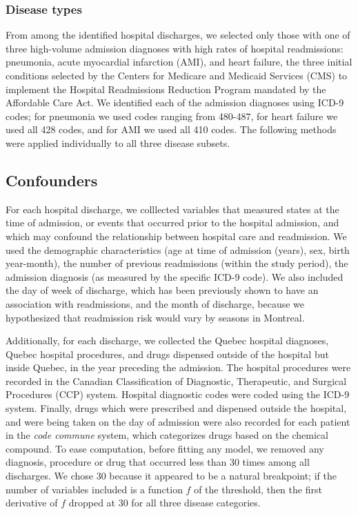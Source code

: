 \documentclass[]{article}\usepackage[]{graphicx}\usepackage[]{color}
\begin{document}
\subsubsection{Disease types}
From among the identified hospital discharges, we selected only those with one of three high-volume admission diagnoses with high rates of hospital readmissions: pneumonia, acute myocardial infarction (AMI), and heart failure, the three initial conditions selected by the Centers for Medicare and Medicaid Services (CMS) to implement the Hospital Readmissions Reduction Program mandated by the Affordable Care Act. We identified each of the admission diagnoses using ICD-9 codes; for pneumonia we used codes ranging from 480-487, for heart failure we used all 428 codes, and for AMI we used all 410 codes. The following methods were applied individually to all three disease subsets. 



\subsection{Confounders}
For each hospital discharge, we colllected variables that measured states at the time of admission, or events that occurred prior to the hospital admission, and which may confound the relationship between hospital care and readmission. We used the demographic characteristics (age at time of admission (years), sex, birth year-month), the number of previous readmissions (within the study period), the admission diagnosis (as measured by the specific ICD-9 code). We also included the day of week of discharge, which has been previously shown to have an association with readmissions, and the month of discharge, because we hypothesized that readmission risk would vary by seasons in Montreal.

Additionally, for each discharge, we collected the Quebec hospital diagnoses, Quebec hospital procedures, and drugs dispensed outside of the hospital but inside Quebec, in the year preceding the admission. The hospital procedures were recorded in the Canadian Classification of Diagnostic, Therapeutic, and Surgical Procedures (CCP) system. Hospital diagnostic codes were coded using the ICD-9 system. Finally, drugs which were prescribed and dispensed outside the hospital, and were being taken on the day of admission were also recorded for each patient in the \emph{code commune} system, which categorizes drugs based on the chemical compound. To ease computation, before fitting any model, we removed any diagnosis, procedure or drug that occurred less than 30 times among all discharges. We chose 30 because it appeared to be a natural breakpoint; if the number of variables included is a function $f$ of the threshold, then the first derivative of $f$ dropped at 30 for all three disease categories.
\end{document}
